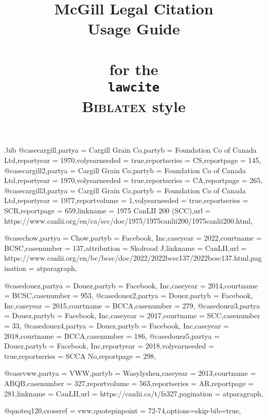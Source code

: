 \begin{filecontents*}[overwrite]{\jobname.bib}
@case{cargill,partya = {Cargill Grain Co},partyb = {Foundation Co of Canada Ltd},reportyear = {1970},volyearneeded = {true},reportseries = {CS},reportpage = {145},}
@case{cargill2,partya = {Cargill Grain Co},partyb = {Foundation Co of Canada Ltd},reportyear = {1970},volyearneeded = {true},reportseries = {CA},reportpage = {265},}
@case{cargill3,partya = {Cargill Grain Co},partyb = {Foundation Co of Canada Ltd},reportyear = {1977},reportvolume = {1},volyearneeded = {true},reportseries = {SCR},reportpage = {659},linkname = {1975 CanLII 200 (SCC)},url = {https://www.canlii.org/en/ca/scc/doc/1975/1975canlii200/1975canlii200.html},}

@case{chow,partya = {Chow},partyb = { Facebook, Inc},caseyear = {2022},courtname = {BCSC},casenumber = {137},attribution = {Skolrood J},linkname = {CanLII},url = {https://www.canlii.org/en/bc/bcsc/doc/2022/2022bcsc137/2022bcsc137.html},pagination = {atparagraph},}

@case{douez,partya = {Douez},partyb = { Facebook, Inc},caseyear = {2014},courtname = {BCSC},casenumber = {953},}
@case{douez2,partya = {Douez},partyb = { Facebook, Inc},caseyear = {2015},courtname = {BCCA},casenumber = {279},}
@case{douez3,partya = {Douez},partyb = { Facebook, Inc},caseyear = {2017},courtname = {SCC},casenumber = {33},}
@case{douez4,partya = {Douez},partyb = { Facebook, Inc},caseyear = {2018},courtname = {BCCA},casenumber = {186},}
@case{douez5,partya = {Douez},partyb = { Facebook, Inc},reportyear = {2018},volyearneeded = {true},reportseries = {SCCA No},reportpage = {298},}

@case{vww,partya = {VWW},partyb = {Wasylyshen},caseyear = {2013},courtname = {ABQB},casenumber = {327},reportvolume = {563},reportseries = {AR},reportpage = {281},linkname = {CanLII},url = {https://canlii.ca/t/fz327},pagination = {atparagraph},}

@quote{q120,crossref = {vww},quotepinpoint = {72-74},options={skip-bib=true},}


\end{filecontents*}




\documentclass[12pt]{article}
\newcommand\rulesep{\rule{0.4\textwidth}{.4pt}}

\title{McGill Legal Citation\\Usage Guide\\ \ \\{\normalsize for  the\\  \texttt{lawcite}\\  \textsc{Biblatex} style}}
\author{}
\date{}
\long\gdef{}
\usepackage[table,dvipsnames,svgnames]{xcolor}
\pagecolor{blue!3}
\usepackage{fontspec}
\setmainfont{Noto Serif}
\setsansfont{TeX Gyre Adventor}[Scale=1.2]%
\setmonofont{Noto Sans Mono}%
\newfontface{}[Colour=blue]
\newcommand\circnum[1]{{\fcircnum#1}}
\usepackage[british]{babel}
\usepackage{csquotes}
\usepackage{graphicx}

